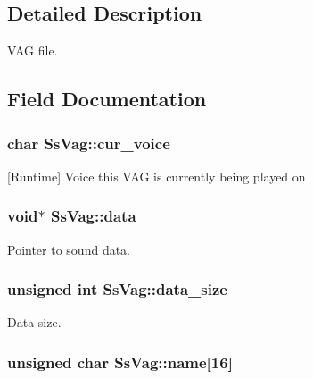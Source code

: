 \subsection{Detailed Description}
V\+A\+G file. 

\subsection{Field Documentation}
\hypertarget{structSsVag_aab6f6eeadc95cb69ccb533e7eb3bfffa}{}
\subsubsection[{cur\+\_\+voice}]{\setlength{\rightskip}{0pt plus 5cm}char Ss\+Vag\+::cur\+\_\+voice}\label{structSsVag_aab6f6eeadc95cb69ccb533e7eb3bfffa}


\mbox{[}Runtime\mbox{]} Voice this V\+A\+G is currently being played on 

\hypertarget{structSsVag_a32e792329ffd00dac0bb87919ac19a75}{}
\subsubsection[{data}]{\setlength{\rightskip}{0pt plus 5cm}void$\ast$ Ss\+Vag\+::data}\label{structSsVag_a32e792329ffd00dac0bb87919ac19a75}


Pointer to sound data. 

\hypertarget{structSsVag_a5a90d2091bd45c5c0bae18ae1bbeed28}{}
\subsubsection[{data\+\_\+size}]{\setlength{\rightskip}{0pt plus 5cm}unsigned int Ss\+Vag\+::data\+\_\+size}\label{structSsVag_a5a90d2091bd45c5c0bae18ae1bbeed28}


Data size. 

\hypertarget{structSsVag_aca71e6a5db585ab73a03d8f0743894e9}{}
\subsubsection[{name}]{\setlength{\rightskip}{0pt plus 5cm}unsigned char Ss\+Vag\+::name\mbox{[}16\mbox{]}}\label{structSsVag_aca71e6a5db585ab73a03d8f0743894e9}


